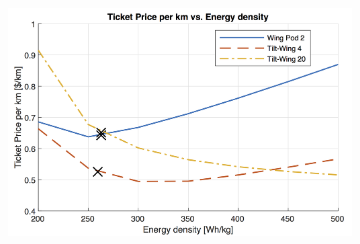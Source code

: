 \begin{figure}[h]
\begin{subfigure}[t]{0.33\textwidth}
\end{subfigure}
\begin{subfigure}[t]{0.33\textwidth}
    \centering
    \includegraphics[width=\textwidth]{Figures/Edens_TPrice_perkmNOPAD.png}
    \captionsetup{justification=centering}
    \caption{}
    \label{fig:sens6}
\end{subfigure}
\captionsetup{justification=centering}
\caption{}
\label{fig:sens456}
\end{figure}

